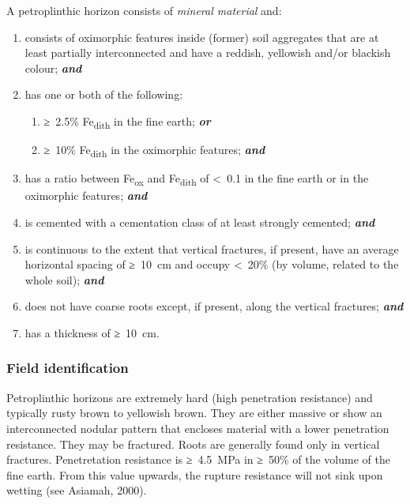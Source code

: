 \documentclass[
  letterpaper,
  DIV=11,
  numbers=noendperiod]{scrreprt}
\providecommand{\tightlist}{%
  \setlength{\itemsep}{0pt}\setlength{\parskip}{0pt}}\usepackage{longtable,booktabs,array}
\begin{document}
A petroplinthic horizon consists of \emph{mineral material} and:

\begin{enumerate}
\def\labelenumi{\arabic{enumi}.}
\tightlist
\item
  consists of oximorphic features inside (former) soil aggregates that
  are at least partially interconnected and have a reddish, yellowish
  and/or blackish colour; \textbf{\emph{and}}
\item
  has one or both of the following:

  \begin{enumerate}
  \def\labelenumii{\alph{enumii}.}
  \tightlist
  \item
    ≥~2.5\% Fe\textsubscript{dith} in the fine earth; \textbf{\emph{or}}
  \item
    ≥~10\% Fe\textsubscript{dith} in the oximorphic features;
    \textbf{\emph{and}}
  \end{enumerate}
\item
  has a ratio between Fe\textsubscript{ox} and Fe\textsubscript{dith} of
  \textless~0.1 in the fine earth or in the oximorphic features;
  \textbf{\emph{and}}
\item
  is cemented with a cementation class of at least strongly cemented;
  \textbf{\emph{and}}
\item
  is continuous to the extent that vertical fractures, if present, have
  an average horizontal spacing of ≥~10~cm and occupy \textless~20\% (by
  volume, related to the whole soil); \textbf{\emph{and}}
\item
  does not have coarse roots except, if present, along the vertical
  fractures; \textbf{\emph{and}}
\item
  has a thickness of ≥~10~cm.
\end{enumerate}

\hypertarget{field-identification-20}{%
\subsubsection{Field identification}\label{field-identification-20}}

Petroplinthic horizons are extremely hard (high penetration resistance)
and typically rusty brown to yellowish brown. They are either massive or
show an interconnected nodular pattern that encloses material with a
lower penetration resistance. They may be fractured. Roots are generally
found only in vertical fractures. Penetretation resistance is ≥~4.5~MPa
in ≥~50\% of the volume of the fine earth. From this value upwards, the
rupture resistance will not sink upon wetting (see Asiamah, 2000).
\end{document}
